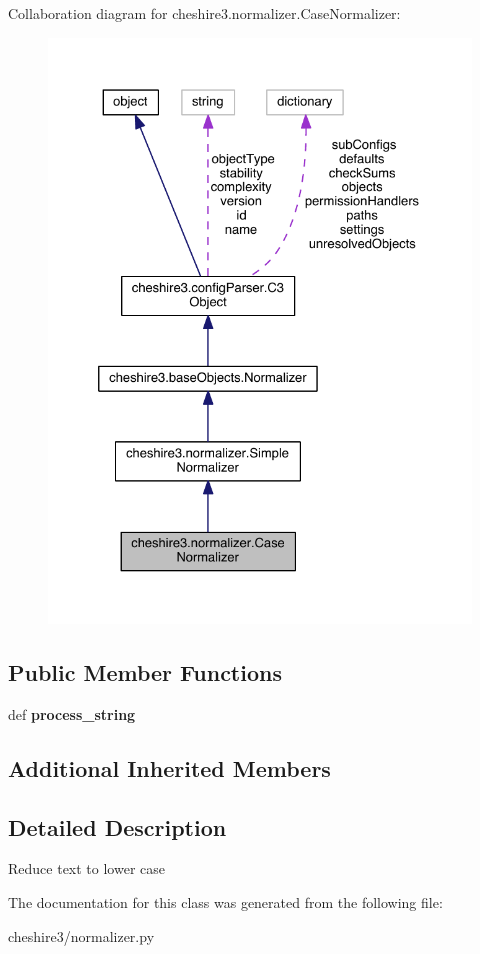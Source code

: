 Collaboration diagram for cheshire3.\-normalizer.\-Case\-Normalizer\-:
\nopagebreak
\begin{figure}[H]
\begin{center}
\leavevmode
\includegraphics[width=328pt]{classcheshire3_1_1normalizer_1_1_case_normalizer__coll__graph}
\end{center}
\end{figure}
\subsection*{Public Member Functions}
\begin{DoxyCompactItemize}
\item 
\hypertarget{classcheshire3_1_1normalizer_1_1_case_normalizer_a3ea23e8f38eea12d1b9040a5a927065c}{def {\bfseries process\-\_\-string}}\label{classcheshire3_1_1normalizer_1_1_case_normalizer_a3ea23e8f38eea12d1b9040a5a927065c}

\end{DoxyCompactItemize}
\subsection*{Additional Inherited Members}


\subsection{Detailed Description}
\begin{DoxyVerb}Reduce text to lower case \end{DoxyVerb}
 

The documentation for this class was generated from the following file\-:\begin{DoxyCompactItemize}
\item 
cheshire3/normalizer.\-py\end{DoxyCompactItemize}

